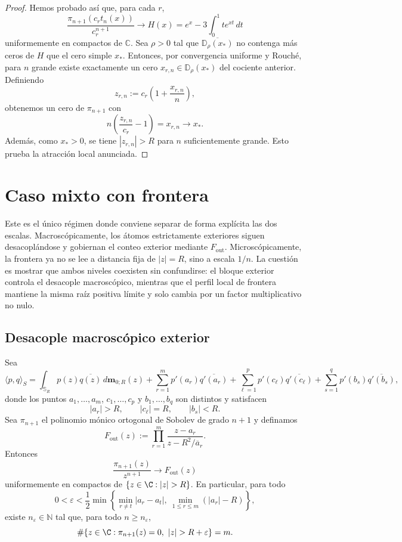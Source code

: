 \begin{proof}
	Hemos probado así que, para cada $r$,
	\[
		\frac{\pi_{n+1}(c_r t_n(x))}{c_r^{n+1}}
		\longrightarrow
		H(x)=e^x-3\int_0^1 t e^{xt}\,dt
	\]
	uniformemente en compactos de $\mathbb C$. Sea $\rho>0$ tal que $\overline{\mathbb D_\rho(x_*)}$ no contenga más ceros de $H$ que el cero simple $x_*$. Entonces, por convergencia uniforme y Rouché, para $n$ grande existe exactamente un cero $x_{r,n}\in\mathbb D_\rho(x_*)$ del cociente anterior. Definiendo
	\[
		z_{r,n}:=c_r\left(1+\frac{x_{r,n}}{n}\right),
	\]
	obtenemos un cero de $\pi_{n+1}$ con
	\[
		n\left(\frac{z_{r,n}}{c_r}-1\right)=x_{r,n}\longrightarrow x_*.
	\]
	Además, como $x_* >0$, se tiene $|z_{r,n}|>R$ para $n$ suficientemente grande. Esto prueba la atracción local anunciada.
\end{proof}

\section{Caso mixto con frontera}

Este es el único régimen donde conviene separar de forma explícita las dos escalas. Macroscópicamente, los átomos estrictamente exteriores siguen desacoplándose y gobiernan el conteo exterior mediante $F_{\mathrm{out}}$. Microscópicamente, la frontera ya no se lee a distancia fija de $|z|=R$, sino a escala $1/n$. La cuestión es mostrar que ambos niveles coexisten sin confundirse: el bloque exterior controla el desacople macroscópico, mientras que el perfil local de frontera mantiene la misma raíz positiva límite y solo cambia por un factor multiplicativo no nulo.

\subsection{Desacople macroscópico exterior}

\begin{thm}\label{thm:desacople_mixto_con_frontera}
	Sea
	\[
		\langle p,q\rangle_S
		=
		\int_{\mathbb S_R}p(z)\overline{q(z)}\,d\mathbf m_{0;R}(z)
		+
		\sum_{r=1}^{m} p'(a_r)\overline{q'(a_r)}
		+
		\sum_{\ell=1}^{p} p'(c_\ell)\overline{q'(c_\ell)}
		+
		\sum_{s=1}^{q} p'(b_s)\overline{q'(b_s)},
	\]
	donde los puntos $a_1,\dots,a_m$, $c_1,\dots,c_p$ y $b_1,\dots,b_q$ son distintos y satisfacen
	\[
		|a_r|>R,\qquad |c_\ell|=R,\qquad |b_s|<R.
	\]
	Sea $\pi_{n+1}$ el polinomio mónico ortogonal de Sobolev de grado $n+1$ y definamos
	\[
		F_{\mathrm{out}}(z):=\prod_{r=1}^{m}\frac{z-a_r}{z-R^2/\overline a_r}.
	\]
	Entonces
	\[
		\frac{\pi_{n+1}(z)}{z^{n+1}}
		\longrightarrow
		F_{\mathrm{out}}(z)
	\]
	uniformemente en compactos de $\{z\in\C:|z|>R\}$. En particular, para todo
	\[
		0<\varepsilon<\frac12\min\left\{\min_{r\ne t}|a_r-a_t|,\ \min_{1\le r\le m}(|a_r|-R)\right\},
	\]
	existe $n_\varepsilon\in\mathbb N$ tal que, para todo $n\ge n_\varepsilon$,
	\[
		\#\{z\in\C:\pi_{n+1}(z)=0,\ |z|>R+\varepsilon\}=m.
	\]
\end{thm}

